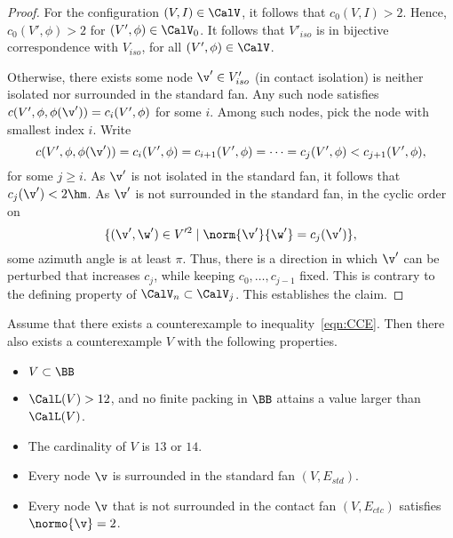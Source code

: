 \begin{proof}
For the configuration $(V,I)\in \CalV$, it follows that $c_0(V,I) >2$.
Hence, $c_0(V',\phi)>2$ for $(V',\phi)\in\CalV_0$.  It follows
that $V'_{iso}$ is in bijective correspondence with
$V_{iso}$, for all $(V',\phi)\in \CalV$.

Otherwise, there exists some node $\v'\in V'_{iso}$ (in contact
isolation) is neither isolated nor surrounded in the standard fan.
Any such node satisfies $c(V',\phi,\phi(\v'))=c_i(V',\phi)$ for some
$i$.  Among such nodes, pick the node with smallest index $i$.
Write
\begin{displaymath}
  c(V',\phi,\phi(\v')) = c_i(V',\phi) = c_{i+1}(V',\phi) 
=\cdots= c_j(V',\phi) < c_{j+1}(V',\phi),
\end{displaymath}
for some $j\ge i$.  As $\v'$ is not isolated in the standard fan, it
follows that $c_j(\v') < 2\hm$.  As $\v'$ is not surrounded in the
standard fan, in the cyclic order on
\begin{displaymath}
\{(\v',\w')\in V'^2 \mid \norm{\v'}{\w'} = c_j(\v')\},
\end{displaymath}
some azimuth angle is at least $\pi$.
Thus, there is a direction in which $\v'$ can be perturbed
that increases $c_j$, while keeping $c_0,\ldots,c_{j-1}$
fixed.  This is contrary to the defining property of
$\CalV_n\subset\CalV_j$.  This establishes the claim.
\end{proof}



\begin{lemma}[]\label{lemma:CE} 
  Assume that there exists a counterexample to
  inequality~\ref{eqn:CCE}.  Then there also exists a counterexample
  $V$ with the following properties.
\begin{itemize}
\item $V\subset \BB$
\item $\CalL(V) > 12$, and no finite packing in $\BB$ attains a value
  larger than $\CalL(V)$.
\item The cardinality of $V$ is $13$ or $14$.
\item Every node $\v$ is surrounded in the standard fan $(V,E_{std})$.
\item Every node $\v$ that is not surrounded in the contact
fan $(V,E_{ctc})$ satisfies $\normo{\v}=2$.
\end{itemize}
\end{lemma}

